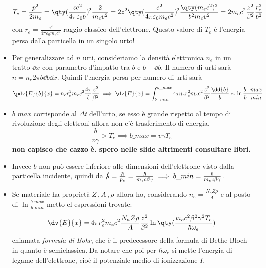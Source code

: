\begin{itemize}
    \begin{equation}\label{eq:E_sing_urto}
        T_e=\frac{p^2}{2m_e}=\qty(\frac{ze^2}{4\pi\varepsilon_0 b})^2\frac2{m_ev^2}=2z^2\qty(\frac{e^2}{4\pi\varepsilon_0m_ec^2})^2\frac{\qty(m_ec^2)^2}{b^2m_ev^2}=2m_ec^2\frac{z^2}{\beta^2}\frac{r_e^2}{b^2}
    \end{equation}
    con $r_e=\frac{e^2}{4\pi\varepsilon_0m_ec^2}$ raggio classico dell'elettrone. Questo valore di $T_e$ è l'energia persa dalla particella in un singolo urto! 
    \item Per generalizzare ad $n$ urti, consideriamo la densità elettronica $n_e$ in un tratto $\dd{x}$ con parametro d'impatto tra $b$ e $b+\dd{b}$. Il numero di urti sarà $n=n_e2\pi b\dd{b}\dd{x}$. Quindi l'energia persa per numero di urti sarà
    \begin{equation*}
        \pdv{E}{b}{x}=n_er_e^2m_ec^2\frac{4\pi}{b}\frac{z^2}{\beta^2}\implies \dv{E}{x}=\int_{b\_{min}}^{b\_{max}} 4\pi n_er_e^2m_ec^2\frac{z^2}{\beta^2}\frac{\dd{b}}{b}\sim \ln \frac{{b\_{max}}}{{b\_{min}}}
    \end{equation*}
    \item $b\_{max}$ corrisponde al $\Delta t$ dell'urto, se esso è grande rispetto al tempo di rivoluzione degli elettroni allora non c'è trasferimento di energia.
    \begin{equation*}
        \frac b {v\gamma} > T_e\implies b\_{max}=v\gamma T_e   
    \end{equation*}
    \textbf{non capisco che cazzo è. spero nelle slide altrimenti consultare libri.}
    \item Invece $b$ non può essere inferiore alle dimensioni dell'elettrone visto dalla particella incidente, quindi da $\slashed \lambda=\frac\hbar{p_e}=\frac\hbar {m_ec\beta\gamma}\implies b\_{min}=\frac{\hbar}{m_ec\beta\gamma}$. 
    \item Se materiale ha proprietà $Z\,,A\,,\rho$ allora ho, considerando $n_e=\frac{N_aZ\rho}{A}$ e al posto di $\ln \frac{{b\_{max}}}{{b\_{min}}}$ metto el espressioni trovate:
    \begin{equation*}
        \dv{E}{x}= 4 \pi r_e^2 m_e c^2 \frac{N_aZ\rho}{A} \frac{z^2}{\beta^2} \ln\qty(\frac{m_ec^2\beta^2\gamma^2T_e}{\hbar\omega_e})  
    \end{equation*}
    chiamata \textit{formula di Bohr}, che è il predecessore della formula di Bethe-Bloch in quanto è semiclassica. Da notare che poi per $\hbar\omega_e$ si mette l'energia di legame dell'elettrone, cioè il potenziale medio di ionizzazione $I$.

\end{itemize}
